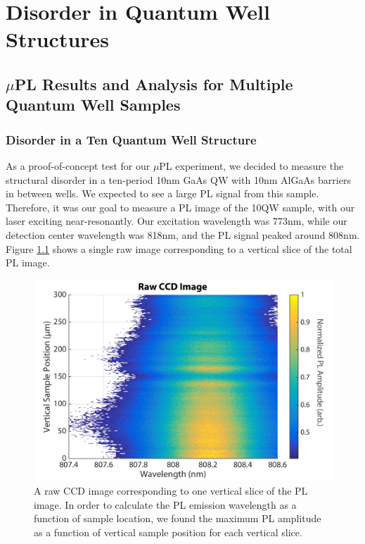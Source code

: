 \chapter{Disorder in Quantum Well Structures}

\section{$\mu$PL Results and Analysis for Multiple Quantum Well Samples}
\subsection{Disorder in a Ten Quantum Well Structure}
\indent As a proof-of-concept test for our $\mu$PL experiment, we decided to measure the structural disorder in a ten-period 10nm GaAs QW with 10nm AlGaAs barriers in between wells. We expected to see a large PL signal from this sample. Therefore, it was our goal to measure a PL image of the 10QW sample, with our laser exciting near-resonantly. Our excitation wavelength was 773nm, while our detection center wavelength was 818nm, and the PL signal peaked around 808nm. Figure \ref{raw10qw} shows a single raw image corresponding to a vertical slice of the total PL image. 
\begin{figure}[h!]
\centering
\includegraphics[width = .8\textwidth]{RAWCCDIMG.png}
\caption{ \doublespacing A raw CCD image corresponding to one vertical slice of the PL image. In order to calculate the PL emission wavelength as a function of sample location, we found the maximum PL amplitude as a function of vertical sample position for each vertical slice.}
\label{raw10qw}
\end{figure}


